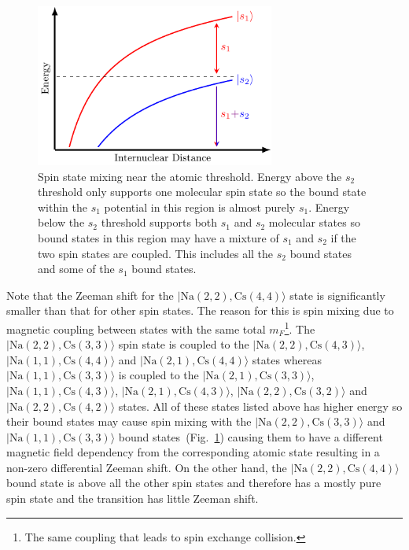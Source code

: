 \begin{figure}
  \centering
  \includegraphics[width=0.7\textwidth]{figures/raman_spectroscopy_spin_mixing.pdf}
  \caption[Spin state mixing near the atomic threshold.]{
    Spin state mixing near the atomic threshold.
    Energy above the $s_2$ threshold only supports one molecular spin state
    so the bound state within the $s_1$ potential in this region is
    almost purely $s_1$.
    Energy below the $s_2$ threshold supports both $s_1$ and $s_2$ molecular states
    so bound states in this region may have a mixture of $s_1$ and $s_2$
    if the two spin states are coupled.
    This includes all the $s_2$ bound states and some of the $s_1$ bound states.
    \label{fig:raman-spectroscopy:spin-mixing}}
\end{figure}

Note that the Zeeman shift for the $|\mathrm{Na(2, 2),Cs(4, 4)}\rangle$ state
is significantly smaller than that for other spin states.
The reason for this is spin mixing due to magnetic coupling between states
with the same total $m_F$\footnote{The same coupling that leads to spin exchange collision.}.
The $|\mathrm{Na(2, 2),Cs(3, 3)}\rangle$ spin state is coupled to the
$|\mathrm{Na(2, 2),Cs(4, 3)}\rangle$, $|\mathrm{Na(1, 1),Cs(4, 4)}\rangle$
and $|\mathrm{Na(2, 1),Cs(4, 4)}\rangle$ states
whereas $|\mathrm{Na(1, 1),Cs(3, 3)}\rangle$ is coupled to the
$|\mathrm{Na(2, 1),Cs(3, 3)}\rangle$, $|\mathrm{Na(1, 1),Cs(4, 3)}\rangle$,
$|\mathrm{Na(2, 1),Cs(4, 3)}\rangle$, $|\mathrm{Na(2, 2),Cs(3, 2)}\rangle$
and $|\mathrm{Na(2, 2),Cs(4, 2)}\rangle$ states.
All of these states listed above has higher energy so their bound states
may cause spin mixing with the $|\mathrm{Na(2, 2),Cs(3, 3)}\rangle$ and
$|\mathrm{Na(1, 1),Cs(3, 3)}\rangle$ bound states~(Fig.~\ref{fig:raman-spectroscopy:spin-mixing})
causing them to have a different magnetic field dependency from the corresponding atomic state
resulting in a non-zero differential Zeeman shift.
On the other hand, the $|\mathrm{Na(2, 2),Cs(4, 4)}\rangle$ bound state is above
all the other spin states and therefore has a mostly pure spin state
and the transition has little Zeeman shift.

